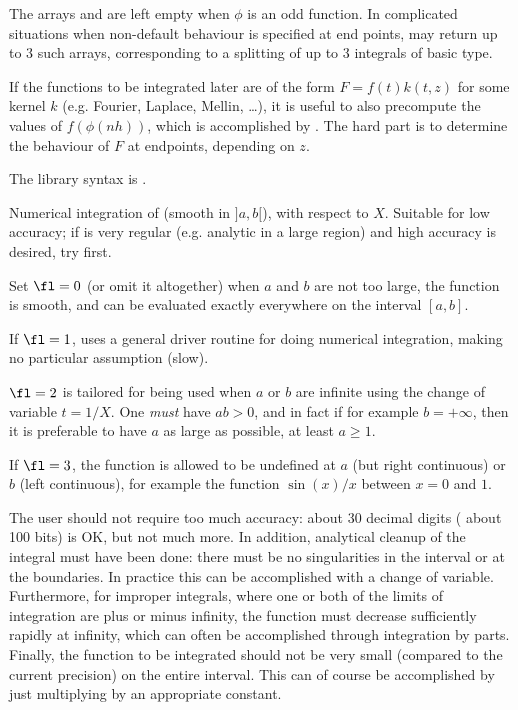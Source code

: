 The arrays  and  are left empty when $\phi$ is an odd
function. In complicated situations when non-default behaviour is specified at
end points,  may return up to $3$ such arrays, corresponding
to a splitting of up to $3$ integrals of basic type.

If the functions to be integrated later are of the form $F = f(t) k(t,z)$
for some kernel $k$ (e.g. Fourier, Laplace, Mellin, \dots), it is
useful to also precompute the values of $f(\phi(nh))$, which is accomplished
by . The hard part is to determine the behaviour
of $F$ at endpoints, depending on $z$.

The library syntax is .

\label{se:intnumromb}
Numerical integration of  (smooth in $]a,b[$), with respect to
$X$. Suitable for low accuracy; if  is very regular (e.g. analytic
in a large region) and high accuracy is desired, try  first.

Set $\fl=0$ (or omit it altogether) when $a$ and $b$ are not too large, the
function is smooth, and can be evaluated exactly everywhere on the interval
$[a,b]$.

If $\fl=1$, uses a general driver routine for doing numerical integration,
making no particular assumption (slow).

$\fl=2$ is tailored for being used when $a$ or $b$ are infinite using the
change of variable $t = 1/X$. One \emph{must} have $ab>0$, and in fact if
for example $b=+\infty$, then it is preferable to have $a$ as large as
possible, at least $a\ge1$.

If $\fl=3$, the function is allowed to be undefined
at $a$ (but right continuous) or $b$ (left continuous),
for example the function $\sin(x)/x$ between $x=0$ and $1$.

The user should not require too much accuracy:  about
30 decimal digits ( about 100 bits) is OK,
but not much more. In addition, analytical cleanup of the integral must have
been done: there must be no singularities in the interval or at the
boundaries. In practice this can be accomplished with a change of
variable. Furthermore, for improper integrals, where one or both of the
limits of integration are plus or minus infinity, the function must decrease
sufficiently rapidly at infinity, which can often be accomplished through
integration by parts. Finally, the function to be integrated should not be
very small (compared to the current precision) on the entire interval. This
can of course be accomplished by just multiplying by an appropriate constant.


